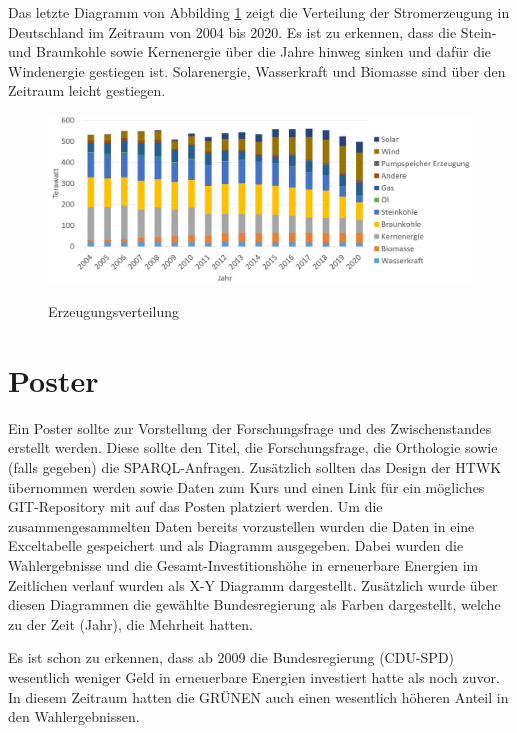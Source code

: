 \documentclass[12pt]{article}
\begin{document}
Das letzte Diagramm von Abbilding \ref{fig:dia-erz} zeigt die Verteilung der Stromerzeugung  in Deutschland im Zeitraum von 2004 bis 2020. Es ist zu erkennen, dass die Stein- und Braunkohle sowie Kernenergie über die Jahre hinweg sinken und dafür die Windenergie gestiegen ist. Solarenergie, Wasserkraft und Biomasse sind über den Zeitraum leicht gestiegen. 

\begin{figure}[!ht]
    \caption{Erzeugungsverteilung}
    \centering
    \includegraphics[width=1.2\textwidth]{images/dia_3.png}
    \label{fig:dia-erz}
\end{figure}

\newpage

    \section{Poster}
    
Ein Poster sollte zur Vorstellung der Forschungsfrage und des Zwischenstandes erstellt werden. Diese sollte den Titel, die Forschungsfrage, die Orthologie sowie (falls gegeben) die SPARQL-Anfragen. Zusätzlich sollten das Design der HTWK übernommen werden sowie Daten zum Kurs und einen Link für ein mögliches GIT-Repository mit auf das Posten platziert werden. Um die zusammengesammelten Daten bereits vorzustellen wurden die Daten in eine Exceltabelle gespeichert und als Diagramm ausgegeben. Dabei wurden die Wahlergebnisse und die Gesamt-Investitionshöhe in erneuerbare Energien im Zeitlichen verlauf wurden als X-Y Diagramm dargestellt. Zusätzlich wurde über diesen Diagrammen die gewählte Bundesregierung als Farben dargestellt, welche zu der Zeit (Jahr), die Mehrheit hatten. 

Es ist schon zu erkennen, dass ab 2009 die Bundesregierung (CDU-SPD) wesentlich weniger Geld in erneuerbare Energien investiert hatte als noch zuvor. In diesem Zeitraum hatten die GRÜNEN auch einen wesentlich höheren Anteil in den Wahlergebnissen. 
\end{document}
